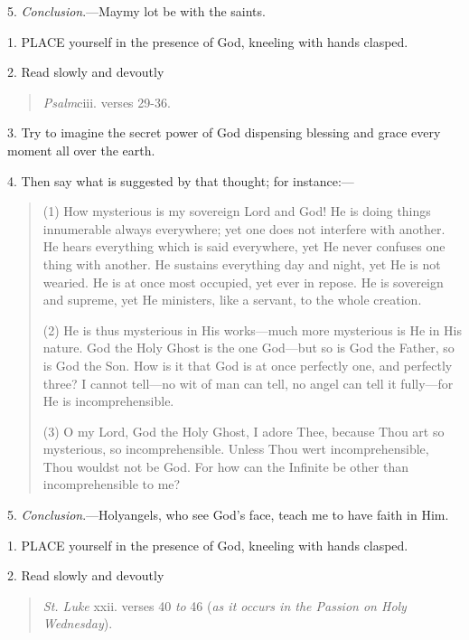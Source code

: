 5. \emph{Conclusion}.—May\emph{}my
lot be with the saints.


1. PLACE
yourself in the presence of God, kneeling with hands clasped.

2. Read slowly and devoutly

\begin{quote}

\emph{Psalm}ciii.
verses 29-36.

\end{quote}

3. Try to imagine the secret
power of God dispensing blessing and grace every moment all over the
earth.

4. Then say what is suggested by
that thought; for instance:—

\begin{quote}

(1) How mysterious is my
sovereign Lord and God! He is doing things innumerable always
everywhere; yet one does not interfere with another. He hears
everything which is said everywhere, yet He never confuses one thing
with another. He sustains everything day and night, yet He is not
wearied. He is at once most occupied, yet ever in repose. He is
sovereign and supreme, yet He ministers, like a servant, to the whole
creation.

(2) He is thus mysterious in
His works—much more mysterious is He in His nature. God the Holy
Ghost is the one God—but so is God the Father, so is God the
Son. How is it that God is at once perfectly one, and perfectly three?
I cannot tell—no wit of man can tell, no angel can tell it
fully—for He is incomprehensible.

(3) O my Lord, God the Holy
Ghost, I adore Thee, because Thou art so mysterious, so
incomprehensible. Unless Thou wert incomprehensible, Thou wouldst not
be God. For how can the Infinite be other than incomprehensible to me?

\end{quote}

5. \emph{Conclusion}.—Holy\emph{}angels,
who see God’s face, teach me to have faith in Him.


1. PLACE
yourself in the presence of God, kneeling with hands clasped.

2. Read slowly and devoutly

\begin{quote}

\emph{St. Luke}
xxii. verses 40 \emph{to} 46 (\emph{as it occurs in the Passion on Holy
Wednesday}).

\end{quote}

